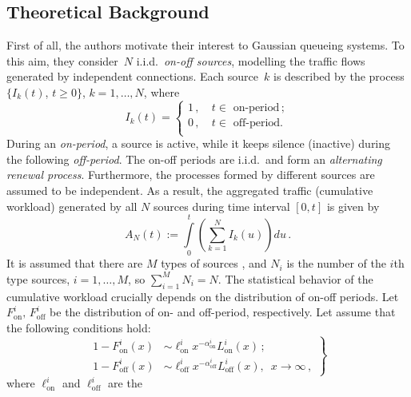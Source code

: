 \begin{multicols}{2}
\vspace*{-6pt}


\section{Theoretical Background}

\noindent
First of all, the authors motivate their interest to Gaussian queueing  systems.
To this aim, they consider~$N$ i.i.d.\ {\it on-off sources}, modelling
the traffic flows generated by independent connections.  Each  source~$k$ is
described by the process $\{I_k(t)$, $t \geq 0\}$, $k=1,\ldots ,N$,
where
\begin{equation*}
I_k(t)=\begin{cases}
 1\,, &\ t\in \mbox{ on-period}\,; \\
 0\,, &\ t\in \mbox{ off-period.} \\
\end{cases}
\end{equation*}
During an {\it on-period}, a source  is active, while  it keeps
silence (inactive) during the following {\it off-period}.  The
on-off periods are i.i.d.\ and  form an {\it alternating renewal
process}. Furthermore, the processes formed by different sources are
assumed to be independent. As a result, the aggregated traffic
(cumulative workload) generated by all $N$ sources during
time interval $[0,t]$ is given by
\begin{equation*}
A_N (t):=\int\limits_0^{t} \left( \sum\limits_{k=1}^N {I_{k}(u)}
\right)du\,.
\end{equation*}
It is assumed  that there are $M$ types of sources , and  $N_i$ is
the number of the $i$th type sources, $i=1,\ldots ,M$, so  $\sum\limits_{i=1}^M
N_i=N$. The statistical behavior of the cumulative workload
crucially depends on the distribution of on-off periods. Let
$F_{\mathrm{on}}^i,\, F_{\mathrm{off}}^i$ be the distribution of on- and off-period,
respectively. Let assume that the following conditions hold:
\begin{equation}
\left.
\begin{array}{rl}
1-F_{\mathrm{on}}^i(x)& \sim  \ell_{\mathrm{on}}^i x^{-\alpha_{\mathrm{on}}^i}L_{\mathrm{on}}^i(x)\,;
\\[9pt]
1-F^i_{\mathrm{off}}(x)& \sim  \ell_{\mathrm{off}}^i
x^{-\alpha_{\mathrm{off}}^i}L_{\mathrm{off}}^i(x),\,\,\,x\to \infty\,,
\end{array}
\right\}
\label{3}
\end{equation}
where $\ell_{\mathrm{on}}^i$ and $\ell_{\mathrm{off}}^i$ are the

\end{multicols}
